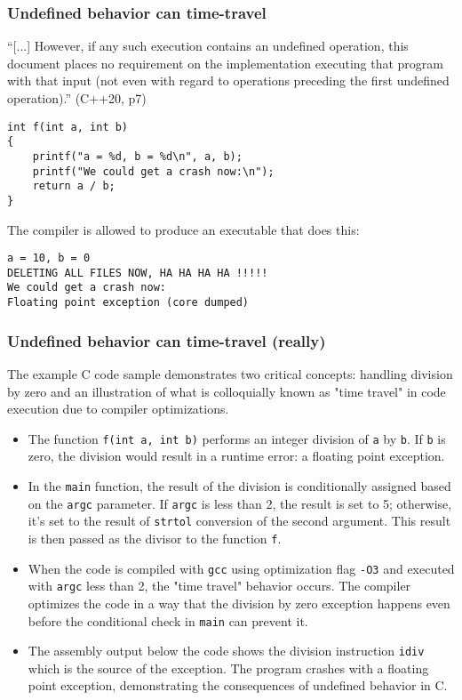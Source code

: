 \documentclass[12pt]{article}
\begin{document}
\subsubsection{Undefined behavior can time-travel}

``[...] However, if any such execution contains an undefined operation,
this document places no requirement on the implementation executing
that program with that input (not even with regard to operations
preceding the first undefined operation).''
(C++20, p7)

\begin{verbatim}
int f(int a, int b)
{
    printf("a = %d, b = %d\n", a, b);
    printf("We could get a crash now:\n");
    return a / b;
}
\end{verbatim}

The compiler is allowed to produce an executable that does this:

\begin{verbatim}
a = 10, b = 0
DELETING ALL FILES NOW, HA HA HA HA !!!!!
We could get a crash now:
Floating point exception (core dumped)
\end{verbatim}

\subsubsection{Undefined behavior can time-travel (really)}

The example C code sample demonstrates two critical concepts: handling division by zero and an illustration of what is colloquially known as "time travel" in code execution due to compiler optimizations.

\begin{itemize}
    \item The function \texttt{f(int a, int b)} performs an integer division of \texttt{a} by \texttt{b}. If \texttt{b} is zero, the division would result in a runtime error: a floating point exception.
    \item In the \texttt{main} function, the result of the division is conditionally assigned based on the \texttt{argc} parameter. If \texttt{argc} is less than 2, the result is set to 5; otherwise, it's set to the result of \texttt{strtol} conversion of the second argument. This result is then passed as the divisor to the function \texttt{f}.
    \item When the code is compiled with \texttt{gcc} using optimization flag \texttt{-O3} and executed with \texttt{argc} less than 2, the "time travel" behavior occurs. The compiler optimizes the code in a way that the division by zero exception happens even before the conditional check in \texttt{main} can prevent it.
    \item The assembly output below the code shows the division instruction \texttt{idiv} which is the source of the exception. The program crashes with a floating point exception, demonstrating the consequences of undefined behavior in C.
\end{itemize}
\end{document}
